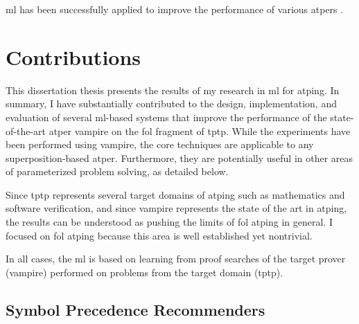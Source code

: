 \Gls{ml} has been successfully applied to improve the performance of various \glspl{atper} \cite{DBLP:journals/corr/abs-2403-04017}.



\section{Contributions}

This dissertation thesis presents the results of my research in \gls{ml} for \gls{atping}.
In summary, I have substantially contributed to the design, implementation, and evaluation of several \acrshort{ml}-based systems that improve the performance of the state-of-the-art \gls{atper} \gls{vampire} on the \gls{fol} fragment of \gls{tptp}.
While the experiments have been performed using \gls{vampire},
the core techniques are applicable to any \gls{superposition}-based \gls{atper}.
Furthermore, they are potentially useful in other areas of parameterized problem solving, as detailed below.

Since \gls{tptp} represents several target domains of \gls{atping}
such as mathematics and software verification,
and since \gls{vampire} represents the state of the art in \gls{atping},
the results can be understood as pushing the limits of \gls{fol} \gls{atping} in general.
I focused on \gls{fol} \gls{atping} because this area is well established yet nontrivial.

In all cases, the \gls{ml} is based on learning from proof searches of the target prover (\gls{vampire}) performed on problems from the target domain (\gls{tptp}).

\subsection{Symbol Precedence Recommenders}
\label{sec:contrib:SymbolPrecedenceRecommenders}


